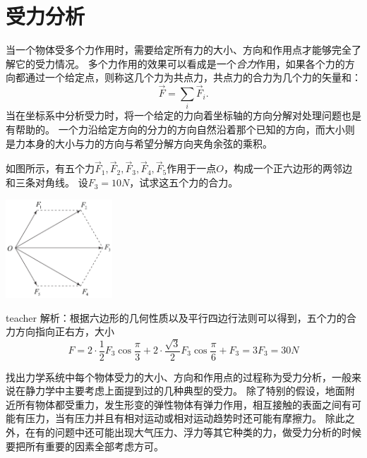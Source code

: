 \section{受力分析}



当一个物体受多个力作用时，需要给定所有力的大小、方向和作用点才能够完全了解它的受力情况。
多个力作用的效果可以看成是一个\emph{合力}作用，如果各个力的方向都通过一个给定点，则称这几个力为共点力，共点力的合力为几个力的矢量和：
\begin{equation}
\vec{F} = \sum_i\vec{F}_i.
\end{equation}
当在坐标系中分析受力时，将一个给定的力向着坐标轴的方向分解对处理问题也是有帮助的。
一个力沿给定方向的分力的方向自然沿着那个已知的方向，而大小则是力本身的大小与力的方向与希望分解方向夹角余弦的乘积。



\begin{example}
如图所示，有五个力$\vec{F}_1,\vec{F}_2,\vec{F}_3,\vec{F}_4,\vec{F}_5$作用于一点$O$，构成一个正六边形的两邻边和三条对角线。
设$F_3 = 10\unit{N}$，试求这五个力的合力。
\begin{flushright}
\includegraphics[width = 0.3\textwidth]{images/static-force-6.pdf} 
\end{flushright}

\begin{taggedblock}{teacher}
\noindent
解析：根据六边形的几何性质以及平行四边行法则可以得到，五个力的合力方向指向正右方，大小
\[
F = 2\cdot\frac{1}{2}F_3\cos\frac{\pi}{3}+2\cdot\frac{\sqrt{3}}{2}F_3\cos\frac{\pi}{6}+F_3 = 3F_3 = 30\unit{N}
\]
\end{taggedblock}
\end{example}




找出力学系统中每个物体受力的大小、方向和作用点的过程称为受力分析，一般来说在静力学中主要考虑上面提到过的几种典型的受力。
除了特别的假设，地面附近所有物体都受重力，发生形变的弹性物体有弹力作用，相互接触的表面之间有可能有压力，当有压力并且有相对运动或相对运动趋势时还可能有摩擦力。
除此之外，在有的问题中还可能出现大气压力、浮力等其它种类的力，做受力分析的时候要把所有重要的因素全部考虑方可。

